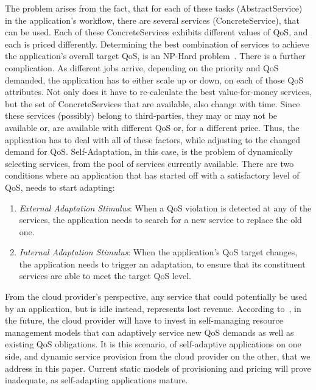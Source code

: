 \documentclass[10pt,journal,compsoc]{IEEEtran}
\begin{document}
The problem arises from the fact, that for each of these tasks (AbstractService) in the application's workflow, there are several services (ConcreteService), that can be used. Each of these ConcreteServices exhibits different values of QoS, and each is priced differently. Determining the best combination of services to achieve the application's overall target QoS, is an NP-Hard problem~\cite{Ardagna2005Global}. There is a further complication. As different jobs arrive, depending on the priority and QoS demanded, the application has to either scale up or down, on each of those QoS attributes. Not only does it have to re-calculate the best value-for-money services, but the set of ConcreteServices that are available, also change with time. Since these services (possibly) belong to third-parties, they may or may not be available or, are available with different QoS or, for a different price. Thus, the application has to deal with all of these factors, while adjusting to the changed demand for QoS.  Self-Adaptation, in this case, is the problem of dynamically selecting services, from the pool of services currently available. There are two conditions where an application that has started off with a satisfactory level of QoS, needs to start adapting:
	\begin{enumerate}
	    \item \textit{External Adaptation Stimulus}: When a QoS violation is detected at any of the services, the application needs to search for a new service to replace the old one.
	     \item \textit{Internal Adaptation Stimulus}: When the application's QoS target changes, the application needs to trigger an adaptation, to ensure that its constituent services are able to meet the target QoS level.
	\end{enumerate} 
From the cloud provider's perspective, any service that could potentially be used by an application, but is idle instead, represents lost revenue. According to~\cite{Buyya2008Market-Oriented}, in the future, the cloud provider will have to invest in self-managing resource management models that can adaptively service new QoS demands as well as existing QoS obligations. It is this scenario, of self-adaptive applications on one side, and dynamic service provision from the cloud provider on the other, that we address in this paper. Current static models of provisioning and pricing will prove inadequate, as self-adapting applications mature.
  
\end{document}
